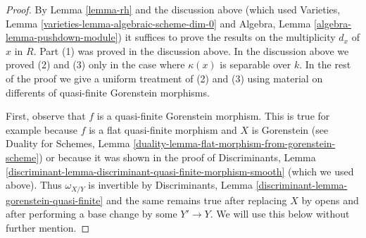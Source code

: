 \documentclass{stacks-project}
\theoremstyle{plain}
\theoremstyle{definition}
\theoremstyle{remark}
\numberwithin{equation}{subsection}
\begin{document}
\begin{proof}
By Lemma \ref{lemma-rh} and the discussion above
(which used
Varieties, Lemma \ref{varieties-lemma-algebraic-scheme-dim-0}
and
Algebra, Lemma \ref{algebra-lemma-pushdown-module})
it suffices to prove the results on the
multiplicity $d_x$ of $x$ in $R$. Part (1) was proved
in the discussion above. In the discussion above
we proved (2) and (3) only in the case where $\kappa(x)$ is
separable over $k$.
In the rest of the proof we give a uniform treatment
of (2) and (3) using material on differents of
quasi-finite Gorenstein morphisms.

\medskip\noindent
First, observe that $f$ is a quasi-finite Gorenstein morphism.
This is true for example because
$f$ is a flat quasi-finite morphism and $X$ is Gorenstein
(see Duality for Schemes, Lemma
\ref{duality-lemma-flat-morphism-from-gorenstein-scheme})
or because it was shown in the proof of
Discriminants, Lemma
\ref{discriminant-lemma-discriminant-quasi-finite-morphism-smooth}
(which we used above). Thus $\omega_{X/Y}$ is invertible by
Discriminants, Lemma \ref{discriminant-lemma-gorenstein-quasi-finite}
and the same remains true after replacing $X$ by opens and after
performing a base change by some $Y' \to Y$. We will use this
below without further mention.


\end{proof}
\end{document}
